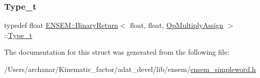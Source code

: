 \mbox{\label{structENSEM_1_1BinaryReturn_3_01float_00_01float_00_01OpMultiplyAssign_01_4_a9d7718a73ef422d2fb14226dbef89f9a}} 
\subsubsection{\texorpdfstring{Type\_t}{Type\_t}\hspace{0.1cm}{\footnotesize\ttfamily [2/2]}}
{\footnotesize\ttfamily typedef float \mbox{\hyperlink{structENSEM_1_1BinaryReturn}{E\+N\+S\+E\+M\+::\+Binary\+Return}}$<$ float, float, \mbox{\hyperlink{structENSEM_1_1OpMultiplyAssign}{Op\+Multiply\+Assign}} $>$\+::\mbox{\hyperlink{structENSEM_1_1BinaryReturn_3_01float_00_01float_00_01OpMultiplyAssign_01_4_a9d7718a73ef422d2fb14226dbef89f9a}{Type\+\_\+t}}}



The documentation for this struct was generated from the following file\+:\begin{DoxyCompactItemize}
\item 
/\+Users/archanar/\+Kinematic\+\_\+factor/adat\+\_\+devel/lib/ensem/\mbox{\hyperlink{lib_2ensem_2ensem__simpleword_8h}{ensem\+\_\+simpleword.\+h}}\end{DoxyCompactItemize}
